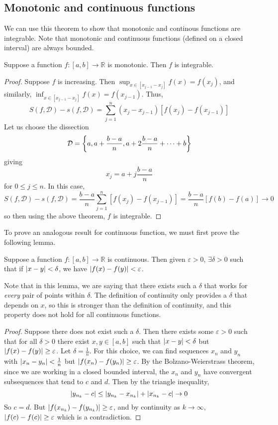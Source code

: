 \subsection{Monotonic and continuous functions}
We can use this theorem to show that monotonic and continous functions are integrable.
Note that monotonic and continuous functions (defined on a closed interval) are always bounded.
\begin{theorem}
	Suppose a function \(f \colon [a, b] \to \mathbb R\) is monotonic.
	Then \(f\) is integrable.
\end{theorem}
\begin{proof}
	Suppose \(f\) is increasing.
	Then \(\sup_{x \in [x_{j-1} - x_j]} f(x) = f(x_j)\), and similarly, \(\inf_{x \in [x_{j-1} - x_j]} f(x) = f(x_{j-1})\).
	Thus,
	\[
		S(f, \mathcal D) - s(f, \mathcal D) = \sum_{j=1}^n (x_j - x_{j-1}) \left[ f(x_j) - f(x_{j-1}) \right]
	\]
	Let us choose the dissection
	\[
		\mathcal D = \qty{ a, a + \frac{b-a}{n}, a + 2\frac{b-a}{n} + \dots + b }
	\]
	giving
	\[
		x_j = a + j\frac{b-a}{n}
	\]
	for \(0 \leq j \leq n\).
	In this case,
	\[
		S(f, \mathcal D) - s(f, \mathcal D) = \frac{b-a}{n} \sum_{j=1}^n \left[ f(x_j) - f(x_{j-1}) \right] = \frac{b-a}{n} \left[ f(b) - f(a) \right] \to 0
	\]
	so then using the above theorem, \(f\) is integrable.
\end{proof}
\noindent To prove an analogous result for continuous function, we must first prove the following lemma.
\begin{lemma}
	Suppose a function \(f \colon [a, b] \to \mathbb R\) is continuous.
	Then given \(\varepsilon > 0\), \(\exists \delta > 0\) such that if \(\abs{x-y} < \delta\), we have \(\abs{f(x) - f(y)} < \varepsilon\).
\end{lemma}
\noindent Note that in this lemma, we are saying that there exists such a \(\delta\) that works for \textit{every} pair of points within \(\delta\).
The definition of continuity only provides a \(\delta\) that depends on \(x\), so this is stronger than the definition of continuity, and this property does not hold for all continuous functions.
\begin{proof}
	Suppose there does not exist such a \(\delta\).
	Then there exists some \(\varepsilon > 0\) such that for all \(\delta > 0\) there exist \(x, y \in [a, b]\) such that \(\abs{x-y} < \delta\) but \(\abs{f(x) - f(y)} \geq \varepsilon\).
	Let \(\delta = \frac{1}{n}\).
	For this choice, we can find sequences \(x_n\) and \(y_n\) with \(\abs{x_n - y_n} < \frac{1}{n}\) but \(\abs{f(x_n) - f(y_n)} \geq \varepsilon\).
	By the Bolzano-Weierstrass theorem, since we are working in a closed bounded interval, the \(x_n\) and \(y_n\) have convergent subsequences that tend to \(c\) and \(d\).
	Then by the triangle inequality,
	\[
		\abs{y_{n_k} - c} \leq \abs{y_{n_k} - x_{n_k}} + \abs{x_{n_k} - c} \to 0
	\]
	So \(c = d\).
	But \(\abs{f(x_{n_k}) - f(y_{n_k})} \geq \varepsilon\), and by continuity as \(k \to \infty\), \(\abs{f(c) - f(c)} \geq \varepsilon\) which is a contradiction.
\end{proof}
